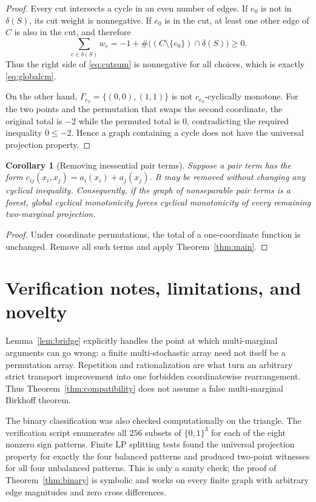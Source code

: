 \documentclass[11pt]{article}
\newtheorem{corollary}[theorem]{Corollary}
\newcommand{\1}{\mathbf 1}
\begin{document}
\begin{proof}
Every cut intersects a cycle in an even number of edges.  If $e_0$ is not
in $\delta(S)$, its cut weight is nonnegative.  If $e_0$ is in the cut,
at least one other edge of $C$ is also in the cut, and therefore
\[
 \sum_{e\in\delta(S)}w_e
 =-1+\#\bigl((C\setminus\{e_0\})\cap\delta(S)\bigr)\ge0.
\]
Thus the right side of \eqref{eq:cutsum} is nonnegative for all choices,
which is exactly \eqref{eq:globalcm}.

On the other hand,
$\Gamma_{e_0}=\{(0,0),(1,1)\}$ is not $c_{e_0}$-cyclically monotone.
For the two points and the permutation that swaps the second coordinate,
the original total is $-2$ while the permuted total is $0$, contradicting
the required inequality $0\le-2$.  Hence a graph containing a cycle does
not have the universal projection property.
\end{proof}

\begin{corollary}[Removing inessential pair terms]
Suppose a pair term has the form
$c_{ij}(x_i,x_j)=a_i(x_i)+a_j(x_j)$.  It may be removed without changing
any cyclical inequality.  Consequently, if the graph of nonseparable pair
terms is a forest, global cyclical monotonicity forces cyclical monotonicity
of every remaining two-marginal projection.
\end{corollary}

\begin{proof}
Under coordinate permutations, the total of a one-coordinate function is
unchanged.  Remove all such terms and apply Theorem~\ref{thm:main}.
\end{proof}

\section{Verification notes, limitations, and novelty}

Lemma~\ref{lem:bridge} explicitly handles the point at which
multi-marginal arguments can go wrong: a finite multi-stochastic array need
not itself be a permutation array.  Repetition and rationalization are what
turn an arbitrary strict transport improvement into one forbidden
coordinatewise rearrangement.  Thus Theorem~\ref{thm:compatibility} does not
assume a false multi-marginal Birkhoff theorem.

The binary classification was also checked computationally on the triangle.
The verification script enumerates all $256$ subsets
of $\{0,1\}^3$ for each of the eight nonzero sign patterns.  Finite LP
splitting tests found the universal projection property for exactly the four
balanced patterns and produced two-point witnesses for all four unbalanced
patterns.  This is only a sanity check; the proof of
Theorem~\ref{thm:binary} is symbolic and works on every finite graph with
arbitrary edge magnitudes and zero cross differences.
\end{document}
